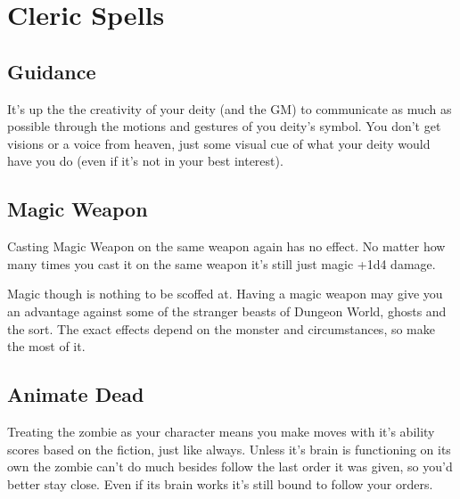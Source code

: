 \chapter{Cleric Spells}
   
 
\section{Guidance}   
 

It's up the the creativity of your deity (and the GM) to communicate as much as possible through the motions and gestures of you deity's symbol. You don't get visions or a voice from heaven, just some visual cue of what your deity would have you do (even if it's not in your best interest).

 
\section{Magic Weapon}    
 

Casting Magic Weapon on the same weapon again has no effect. No matter how many times you cast it on the same weapon it's still just magic +1d4 damage.

 

Magic though is nothing to be scoffed at. Having a magic weapon may give you an advantage against some of the stranger beasts of Dungeon World, ghosts and the sort. The exact effects depend on the monster and circumstances, so make the most of it.

 
\section{Animate Dead}    
 

Treating the zombie as your character means you make moves with it's ability scores based on the fiction, just like always. Unless it's brain is functioning on its own the zombie can't do much besides follow the last order it was given, so you'd better stay close. Even if its brain works it's still bound to follow your orders.

 
